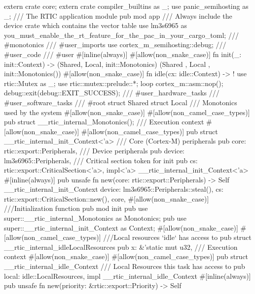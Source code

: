 extern crate core;
extern crate compiler_builtins as _;
use panic_semihosting as _;
/// The RTIC application module
pub mod app {
    /// Always include the device crate which contains the vector table
    use lm3s6965 as you_must_enable_the_rt_feature_for_the_pac_in_your_cargo_toml;
    /// #monotonics
    /// #user_imports
    use cortex_m_semihosting::debug;
    /// #user_code
    /// #user
    #[inline(always)]
    #[allow(non_snake_case)]
    fn init(_: init::Context) -> (Shared, Local, init::Monotonics) {
        (Shared {}, Local {}, init::Monotonics())
    }
    #[allow(non_snake_case)]
    fn idle(cx: idle::Context) -> ! {
        use rtic::Mutex as _;
        use rtic::mutex::prelude::*;
        loop {
            cortex_m::asm::nop();
            debug::exit(debug::EXIT_SUCCESS);
        }
    }
    /// #user_hardware_tasks
    /// #user_software_tasks
    /// #root
    struct Shared {}
    struct Local {}
    /// Monotonics used by the system
    #[allow(non_snake_case)]
    #[allow(non_camel_case_types)]
    pub struct __rtic_internal_Monotonics();
    /// Execution context
    #[allow(non_snake_case)]
    #[allow(non_camel_case_types)]
    pub struct __rtic_internal_init_Context<'a> {
        /// Core (Cortex-M) peripherals
        pub core: rtic::export::Peripherals,
        /// Device peripherals
        pub device: lm3s6965::Peripherals,
        /// Critical section token for init
        pub cs: rtic::export::CriticalSection<'a>,
    }
    impl<'a> __rtic_internal_init_Context<'a> {
        #[inline(always)]
        pub unsafe fn new(core: rtic::export::Peripherals) -> Self {
            __rtic_internal_init_Context {
                device: lm3s6965::Peripherals::steal(),
                cs: rtic::export::CriticalSection::new(),
                core,
            }
        }
    }
    #[allow(non_snake_case)]
    ///Initialization function
    pub mod init {
        pub use super::__rtic_internal_Monotonics as Monotonics;
        pub use super::__rtic_internal_init_Context as Context;
    }
    #[allow(non_snake_case)]
    #[allow(non_camel_case_types)]
    ///Local resources `idle` has access to
    pub struct __rtic_internal_idleLocalResources {
        pub x: &'static mut u32,
    }
    /// Execution context
    #[allow(non_snake_case)]
    #[allow(non_camel_case_types)]
    pub struct __rtic_internal_idle_Context {
        /// Local Resources this task has access to
        pub local: idle::LocalResources,
    }
    impl __rtic_internal_idle_Context {
        #[inline(always)]
        pub unsafe fn new(priority: &rtic::export::Priority) -> Self {
}}}
